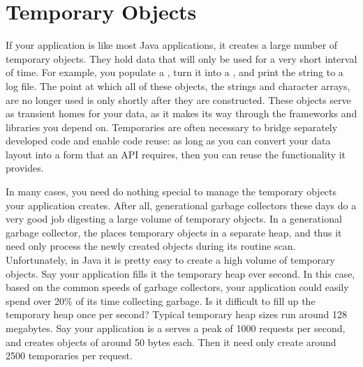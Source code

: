 \section{Temporary Objects}
\label{temporary-lifetime}

If your application is like most Java applications, it creates a large number of
temporary objects. They hold data that will only be used for a very short
interval of time. For example, you populate a , turn it into
a , and print the string to a log file. The point at which all of
these objects, the strings and character arrays, are no longer used is only
shortly after they are constructed. These objects serve as transient homes for
your data, as it makes its way through the frameworks and libraries you depend
on. Temporaries are often necessary to bridge separately developed code and
enable code reuse: as long as you can convert your data layout into a form that
an API requires, then you can reuse the functionality it provides.

In many cases, you need do nothing special to manage the temporary objects your
application creates. After all, generational garbage collectors these days do a
very good job digesting a large volume of temporary objects. In a generational
garbage collector, the \jre places temporary objects in a separate heap, and
thus it need only process the newly created objects during its routine scan.
Unfortunately, in Java it is pretty easy to create a high volume of temporary
objects. Say your application 
fills it the temporary heap ever second. In this case, based on the common
speeds of garbage collectors, your application could easily spend over 20\% of its time
collecting garbage.
Is it difficult to fill up the temporary heap once per second? Typical
temporary heap sizes run around 128 megabytes. Say your application is a serves
a peak of 1000 requests per second, and creates objects of around 50 bytes each.
Then it need only create around 2500 temporaries per request. 



